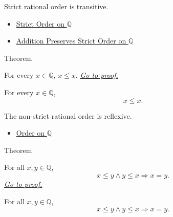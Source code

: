 \begin{remark*}[Interpretation]
Strict rational order is transitive.
\end{remark*}

\begin{dependencies}
\begin{itemize}
  \item \hyperref[def:strict-order-on-q]{Strict Order on $\mathbb{Q}$}
  \item \hyperref[thm:addition-preserves-strict-order-on-q]{Addition Preserves Strict Order on $\mathbb{Q}$}
\end{itemize}
\end{dependencies}

\begin{theorembox}{Theorem}
\begin{theorem}
\label{thm:order-on-q-reflexive}
For every $x\in\mathbb{Q}$, $x\le x$.
\hyperref[prf:order-on-q-reflexive]{\textit{Go to proof.}}
\end{theorem}
\end{theorembox}

\begin{remark*}
For every $x\in\mathbb{Q}$,
\[
x\le x.
\]
\end{remark*}

\begin{remark*}[Interpretation]
The non-strict rational order is reflexive.
\end{remark*}

\begin{dependencies}
\begin{itemize}
  \item \hyperref[def:order-on-q]{Order on $\mathbb{Q}$}
\end{itemize}
\end{dependencies}

\begin{theorembox}{Theorem}
\begin{theorem}
\label{thm:order-on-q-antisymmetric}
For all $x,y\in\mathbb{Q}$,
\[
x\le y\land y\le x \Longrightarrow x=y.
\]
\hyperref[prf:order-on-q-antisymmetric]{\textit{Go to proof.}}
\end{theorem}
\end{theorembox}

\begin{remark*}
For all $x,y\in\mathbb{Q}$,
\[
x\le y\land y\le x\Longrightarrow x=y.
\]
\end{remark*}

